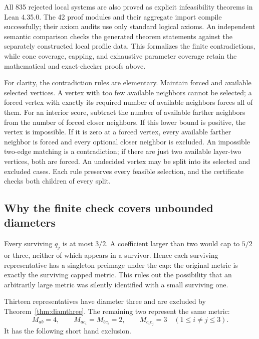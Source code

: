 All 835 rejected local systems are also proved as explicit infeasibility
theorems in Lean 4.35.0. The 42 proof modules and their aggregate import
compile successfully; their axiom audits use only standard logical axioms.
An independent semantic comparison checks the generated theorem statements
against the separately constructed local profile data. This formalizes
the finite contradictions, while cone coverage, capping, and exhaustive
parameter coverage retain the mathematical and exact-checker proofs above.

For clarity, the contradiction rules are elementary. Maintain forced and
available selected vertices. A vertex with too few available neighbors
cannot be selected; a forced vertex with exactly its required number of
available neighbors forces all of them. For an interior score, subtract
the number of available farther neighbors from the number of forced closer
neighbors. If this lower bound is positive, the vertex is impossible.
If it is zero at a forced vertex, every available farther neighbor is
forced and every optional closer neighbor is excluded. An impossible
two-edge matching is a contradiction; if there are just two available
layer-two vertices, both are forced. An undecided vertex may be split
into its selected and excluded cases. Each rule preserves every feasible
selection, and the certificate checks both children of every split.

\subsection{Why the finite check covers unbounded diameters}
Every surviving $q_j$ is at most $3/2$. A coefficient larger than two
would cap to $5/2$ or three, neither of which appears in a survivor.
Hence each surviving representative has a singleton preimage under the
cap: the original metric is exactly the surviving capped metric.
This rules out the possibility that an arbitrarily large metric was
silently identified with a small surviving one.

Thirteen representatives have diameter three and are excluded by
Theorem~\ref{thm:diamthree}. The remaining two represent the same metric:
\begin{equation}\label{eq:specialfour}
 M_{ab}=4,\qquad M_{a c_i}=M_{b c_i}=2,\qquad
 M_{c_i c_j}=3\quad(1\le i\ne j\le3).
\end{equation}
It has the following short hand exclusion.


